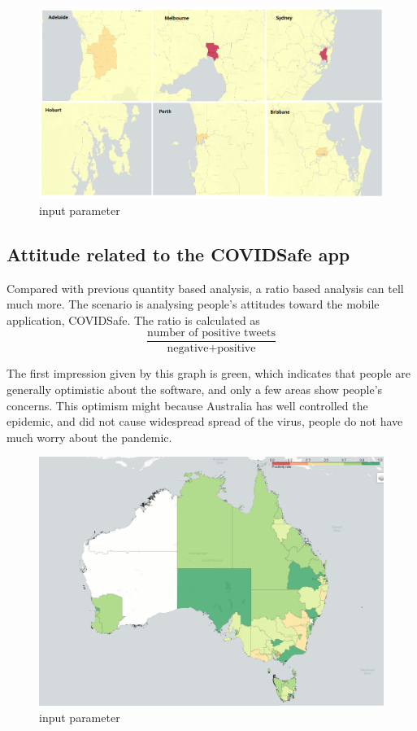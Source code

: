 \begin{figure}[H]
\centering
\includegraphics[scale=0.4]{city_analytics/report/images/covid-tweets-each-city.png}
\caption{input parameter}
\label{fig:input parameter}
\end{figure}

\subsection{Attitude related to the COVIDSafe app} 
Compared with previous quantity based analysis, a ratio based analysis can tell much more. The scenario is analysing people's attitudes toward the mobile application, COVIDSafe. The ratio is calculated as
\[\frac{\text{number of positive tweets}}{\text{negative} + \text{positive}}\]

The first impression given by this graph is green, which indicates that people are generally optimistic about the software, and only a few areas show people's concerns. This optimism might because Australia has well controlled the epidemic, and did not cause widespread spread of the virus, people do not have much worry about the pandemic.

\begin{figure}[H]
\centering
\includegraphics[scale=0.4]{city_analytics/report/images/covidsafe.png}
\caption{input parameter}
\label{fig:input parameter}
\end{figure}

